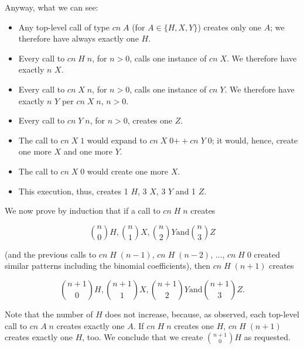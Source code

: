 \documentclass[tikz]{scrreprt}
\newcommand{\Conid}[1]{\mathit{#1}}
\newcommand{\Varid}[1]{\mathit{#1}}
\newcommand{\plus}{\mathbin{+\!\!\!+}}
\begin{document}
Anyway, what we can see:
\begin{itemize}
\item Any top-level call of type \ensuremath{\Varid{cn}\;\Conid{A}} 
      (for $A \in \lbrace H,X,Y\rbrace$)
      creates only one \ensuremath{\Conid{A}};
      we therefore have always exactly one \ensuremath{\Conid{H}}.
\item Every call to \ensuremath{\Varid{cn}\;\Conid{H}\;\Varid{n}}, for $n > 0$,
      calls one instance of \ensuremath{\Varid{cn}\;\Conid{X}}.
      We therefore have exactly $n$ \ensuremath{\Conid{X}}.
\item Every call to \ensuremath{\Varid{cn}\;\Conid{X}\;\Varid{n}}, for $n > 0$,
      calls one instance of \ensuremath{\Varid{cn}\;\Conid{Y}}.
      We therefore have exactly $n$ \ensuremath{\Conid{Y}} per \ensuremath{\Varid{cn}\;\Conid{X}\;\Varid{n}},
      $n > 0$.
\item Every call to \ensuremath{\Varid{cn}\;\Conid{Y}\;\Varid{n}}, for $n>0$, creates one \ensuremath{\Conid{Z}}.
\item The call to \ensuremath{\Varid{cn}\;\Conid{X}\;\mathrm{1}} would expand to
      \ensuremath{\Varid{cn}\;\Conid{X}\;\mathrm{0}\plus \Varid{cn}\;\Conid{Y}\;\mathrm{0}}; it would, hence,
      create one more \ensuremath{\Conid{X}} and one more \ensuremath{\Conid{Y}}.
\item The call to \ensuremath{\Varid{cn}\;\Conid{X}\;\mathrm{0}} would create one more \ensuremath{\Conid{X}}.
\item This execution, thus, creates
      1 \ensuremath{\Conid{H}}, 3 \ensuremath{\Conid{X}}, 3 \ensuremath{\Conid{Y}} and 1 \ensuremath{\Conid{Z}}.
\end{itemize}

We now prove by induction that if a call to \ensuremath{\Varid{cn}\;\Conid{H}\;\Varid{n}}
creates 

\[
\binom{n}{0}H, \binom{n}{1}X, \binom{n}{2}Y 
\text{and} \binom{n}{3}Z
\]

(and the previous calls to \ensuremath{\Varid{cn}\;\Conid{H}\;(\Varid{n}\mathbin{-}\mathrm{1})}, \ensuremath{\Varid{cn}\;\Conid{H}\;(\Varid{n}\mathbin{-}\mathrm{2})},
$\dots$, \ensuremath{\Varid{cn}\;\Conid{H}\;\mathrm{0}} created similar patterns including
the binomial coefficients),
then \ensuremath{\Varid{cn}\;\Conid{H}\;(\Varid{n}\mathbin{+}\mathrm{1})} creates

\[
\binom{n+1}{0}H, \binom{n+1}{1}X, \binom{n+1}{2}Y 
\text{and} \binom{n+1}{3}Z.
\]

Note that the number of \ensuremath{\Conid{H}} does not increase,
because, as observed, each top-level call to \ensuremath{\Varid{cn}\;\Conid{A}\;\Varid{n}}
creates exactly one \ensuremath{\Conid{A}}.
If \ensuremath{\Varid{cn}\;\Conid{H}\;\Varid{n}} creates one \ensuremath{\Conid{H}},
\ensuremath{\Varid{cn}\;\Conid{H}\;(\Varid{n}\mathbin{+}\mathrm{1})} creates exactly one \ensuremath{\Conid{H}}, too.
We conclude that we create $\binom{n+1}{0}H$ as requested.
\end{document}
